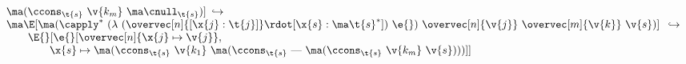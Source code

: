 $$\begin{array}{l@{\hspace*{0.5em}\red\hspace*{0.5em}}l}
{{                                  {\econs{\t{s}}{\v{k_m}}{\enull{\t{s}}}}}]} \\
    \multicolumn{2}{l}{
    \inE{\ESOPcomb{\capply^*}{(\lambda\ (\overvec[n]{[\x{j} : \t{j}]} \rdot [\x{s} : \starred{\t{s}}])\ \e{})\ \overvec[n]{\v{j}}\ \overvec[m]{\v{k}}\ \v{s}}} \hspace*{0.5em} \red
    } \\
    \multicolumn{2}{l}{\hspace*{2em}
      \E{}[\e{}[\overvec[n]{\x{j} \mapsto \v{j}},}\\
    \multicolumn{2}{l}{\hspace*{4em}
      \x{s} \mapsto \econs{\t{s}}{\v{k_1}}
                          {\econs{\t{s}}{\text{---}}
                                 {\econs{\t{s}}{\v{k_m}}{\v{s}}}}]]} \\
  \end{array}$$